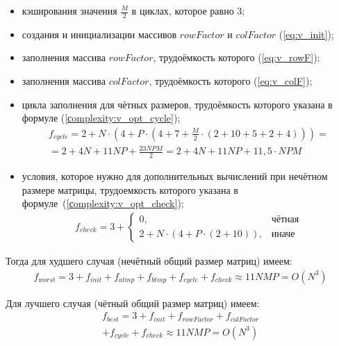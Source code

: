 \begin{itemize}[label=---]
	\item кэширования значения $\frac{M}{2}$ в циклах, которое равно 3;
	\item создания и инициализации массивов $rowFactor$ и $colFactor$ (\ref{eq:v_init});
	\item заполнения массива $rowFactor$, трудоёмкость которого (\ref{eq:v_rowF});
	\item заполнения массива $colFactor$, трудоёмкость которого (\ref{eq:v_colF});
	\item цикла заполнения для чётных размеров, трудоёмкость которого указана в формуле (\ref{сomplexity:v_opt_cycle});
	\begin{equation}
		\label{сomplexity:v_opt_cycle}
		\begin{aligned}
			f_{cycle} = 2 + N \cdot (4 + P \cdot (4 + 7 + \frac{M}{2} \cdot (2 + 10 + 5 + 2 + 4))) = \\
			= 2 + 4N + 11NP + \frac{23NPM}{2}  = 2 + 4N + 11NP + 11,5 \cdot NPM 
		\end{aligned}
	\end{equation}
	\item условия, которое нужно для дополнительных вычислений при нечётном размере матрицы, трудоемкость которого указана в формуле~(\ref{сomplexity:v_opt_check});
	\begin{equation}
		\label{сomplexity:v_opt_check}
		\begin{aligned}
			f_{check} = 3 + 
			\begin{cases}
				0, & \text{чётная} \\
				2 + N \cdot (4 + P \cdot (2 + 10)), & \text{иначе}
			\end{cases}
		\end{aligned}  
	\end{equation}
\end{itemize}

Тогда для худшего случая (нечётный общий размер матриц) имеем:
\begin{equation}
	\label{сomplexity:vinograd_opt_worst}
	\begin{aligned}
		f_{worst} = 3 + f_{init} + f_{atmp} + f_{btmp} + f_{cycle} + f_{check} \approx 11NMP = O(N^3)
	\end{aligned}
\end{equation}

Для лучшего случая (чётный общий размер матриц) имеем:
\begin{equation}
	\label{сomplexity:vinograd_opt_best}
	\begin{aligned}
		f_{best} = 3 + f_{init} + f_{rowFactor} + f_{colFactor} \\
		+ f_{cycle} + f_{check} \approx 11NMP = O(N^3)
	\end{aligned}
\end{equation}

